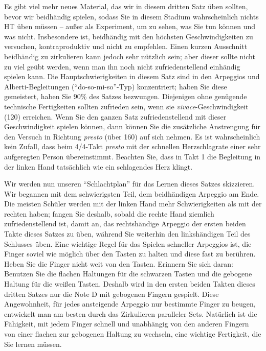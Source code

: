 Es gibt viel mehr neues Material, das wir in diesem dritten Satz üben sollten, bevor wir beidhändig spielen, sodass Sie in diesem Stadium wahrscheinlich nichts HT üben müssen -- außer als Experiment, um zu sehen, was Sie tun können und was nicht.
Insbesondere ist, beidhändig mit den höchsten Geschwindigkeiten zu versuchen, kontraproduktiv und nicht zu empfehlen.
Einen kurzen Ausschnitt beidhändig zu zirkulieren kann jedoch sehr nützlich sein; aber dieser sollte nicht zu viel geübt werden, wenn man ihn noch nicht zufriedenstellend einhändig spielen kann.
Die Hauptschwierigkeiten in diesem Satz sind in den Arpeggios und Alberti-Begleitungen (\enquote{do-so-mi-so}-Typ)  konzentriert; haben Sie diese gemeistert, haben Sie 90\% des Satzes bezwungen.
Diejenigen ohne genügende technische Fertigkeiten sollten zufrieden sein, wenn sie \textit{vivace}-Geschwindigkeit (120) erreichen.
Wenn Sie den ganzen Satz zufriedenstellend mit dieser Geschwindigkeit spielen können, dann können Sie die zusätzliche Anstrengung für den Versuch in Richtung \textit{presto} (über 160) auf sich nehmen.
Es ist wahrscheinlich kein Zufall, dass beim 4/4-Takt \textit{presto} mit der schnellen Herzschlagrate einer sehr aufgeregten Person übereinstimmt.
Beachten Sie, dass in Takt 1 die Begleitung in der linken Hand tatsächlich wie ein schlagendes Herz klingt.

Wir werden nun unseren \enquote{Schlachtplan} für das Lernen dieses Satzes skizzieren.
Wir begannen mit dem schwierigsten Teil, dem beidhändigen Arpeggio am Ende.
Die meisten Schüler werden mit der linken Hand mehr Schwierigkeiten als mit der rechten haben; fangen Sie deshalb, sobald die rechte Hand ziemlich zufriedenstellend ist, damit an, das rechtshändige Arpeggio der ersten beiden Takte dieses Satzes zu üben, während Sie weiterhin den linkshändigen Teil des Schlusses üben.
Eine wichtige Regel für das Spielen schneller Arpeggios ist, die Finger soviel wie möglich über den Tasten zu halten und diese fast zu berühren.
Heben Sie die Finger nicht weit von den Tasten.
Erinnern Sie sich daran: Benutzen Sie die flachen Haltungen für die schwarzen Tasten und die gebogene Haltung für die weißen Tasten.
Deshalb wird in den ersten beiden Takten dieses dritten Satzes nur die Note D mit gebogenen Fingern gespielt.
Diese Angewohnheit, für jedes ansteigende Arpeggio nur bestimmte Finger zu beugen, entwickelt man am besten durch das Zirkulieren paralleler Sets.
Natürlich ist die Fähigkeit, mit jedem Finger schnell und unabhängig von den anderen Fingern von einer flachen zur gebogenen Haltung zu wechseln, eine wichtige Fertigkeit, die Sie lernen müssen.

